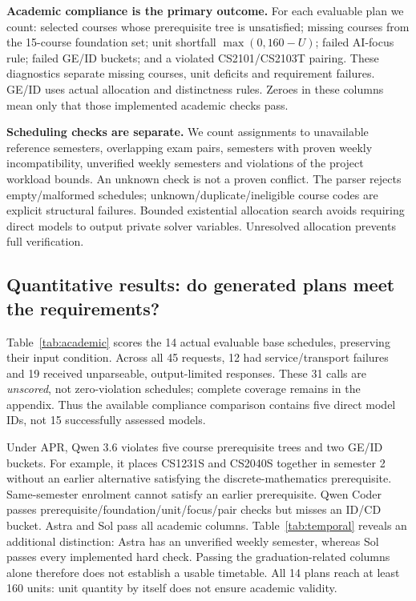 \textbf{Academic compliance is the primary outcome.} For each evaluable plan we count: selected courses whose prerequisite tree is unsatisfied; missing courses from the 15-course foundation set; unit shortfall $\max(0,160-U)$; failed AI-focus rule; failed GE/ID buckets; and a violated CS2101/CS2103T pairing. These diagnostics separate missing courses, unit deficits and requirement failures. GE/ID uses actual allocation and distinctness rules. Zeroes in these columns mean only that those implemented academic checks pass.

\textbf{Scheduling checks are separate.} We count assignments to unavailable reference semesters, overlapping exam pairs, semesters with proven weekly incompatibility, unverified weekly semesters and violations of the project workload bounds. An unknown check is not a proven conflict. The parser rejects empty/malformed schedules; unknown/duplicate/ineligible course codes are explicit structural failures. Bounded existential allocation search avoids requiring direct models to output private solver variables. Unresolved allocation prevents full verification.

\subsection{Quantitative results: do generated plans meet the requirements?}



Table~\ref{tab:academic} scores the 14 actual evaluable base schedules, preserving their input condition. Across all 45 requests, 12 had service/transport failures and 19 received unparseable, output-limited responses. These 31 calls are \emph{unscored}, not zero-violation schedules; complete coverage remains in the appendix. Thus the available compliance comparison contains five direct model IDs, not 15 successfully assessed models.

Under APR, Qwen 3.6 violates five course prerequisite trees and two GE/ID buckets. For example, it places CS1231S and CS2040S together in semester 2 without an earlier alternative satisfying the discrete-mathematics prerequisite. Same-semester enrolment cannot satisfy an earlier prerequisite. Qwen Coder passes prerequisite/foundation/unit/focus/pair checks but misses an ID/CD bucket. Astra and Sol pass all academic columns. Table~\ref{tab:temporal} reveals an additional distinction: Astra has an unverified weekly semester, whereas Sol passes every implemented hard check. Passing the graduation-related columns alone therefore does not establish a usable timetable. All 14 plans reach at least 160 units: unit quantity by itself does not ensure academic validity.

